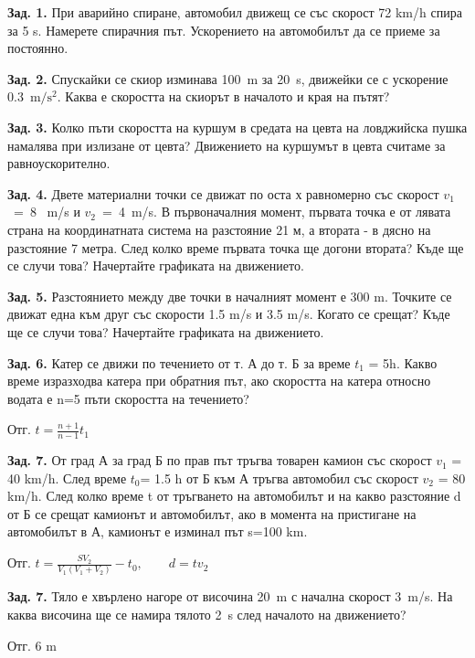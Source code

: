 \documentclass[a4paper,10pt]{article}
\begin{document}
\textbf{Зад. 1.} 
При аварийно спиране, автомобил движещ се със скорост 72 km/h спира за 5 s.
Намерете спирачния път. Ускорението на автомобилът да се приеме за постоянно.

\textbf{Зад. 2.} 
Спускайки се скиор изминава 100~m за 20~s, движейки се с ускорение 0.3~$\mathrm{m/s^2}$.
Каква е скоростта на скиорът в началото и края на пътят?


\textbf{Зад. 3.} 
Колко пъти скоростта на куршум в средата на цевта на ловджийска пушка намалява при излизане от цевта?
Движението на куршумът в цевта считаме за равноускорително.


\textbf{Зад. 4.}
Двете материални точки се движат по оста х равномерно със скорост $v_1$~=~8~ m/s и $v_2$~=~4~m/s. 
В първоначалния момент, първата точка е от лявата страна на координатната система на разстояние 21 м,
а втората - в дясно на разстояние 7 метра.
След колко време първата точка ще догони втората? Къде ще се случи това?
Начертайте графиката на движението.

\textbf{Зад. 5.}
Разстоянието между две точки в началният момент е 300 m.
Точките се движат една към друг със скорости 1.5 m/s и 3.5 m/s.
Когато се срещат? Къде ще се случи това?
Начертайте графиката на движението.

\textbf{Зад. 6.}
Катер се движи по течението от т. А до т. Б за време $t_1$ = 5h.
Какво време изразходва катера при обратния път, ако
скоростта на катера относно водата е n=5 пъти скоростта на течението?
\begin{flushright}
Отг. $t=\frac{n+1}{n-1}t_1$ 
\end{flushright}

\textbf{Зад. 7.}
От град А за град Б по прав път тръгва товарен камион със скорост $v_1$ = 40 km/h.
След време $t_0$= 1.5 h от Б към А тръгва автомобил със скорост $v_2$ = 80 km/h.
След колко време t от тръгването на автомобилът и на какво разстояние d от Б
се срещат камионът и автомобилът, ако в момента на пристигане на автомобилът в А,
камионът е изминал път s=100 km.
\begin{flushright}
Отг. $t=\frac{SV_2}{V_1(V_1+V_2)} - t_0,\qquad d=tv_2$ 
\end{flushright}

\textbf{Зад. 7.}
Тяло е хвърлено нагоре от височина 20~m с начална скорост 3~m/s.
На каква височина ще се намира тялото 2~s  след началото на движението?
\begin{flushright}
Отг. 6 m 
\end{flushright}
\end{document}
